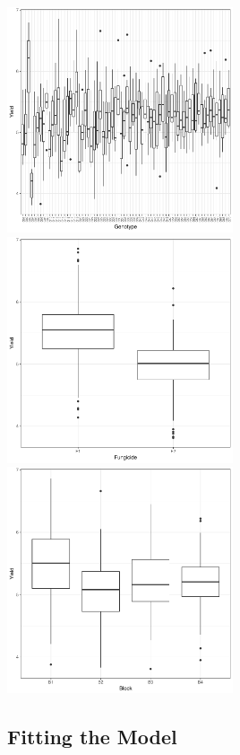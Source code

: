 \documentclass[a4paper, 10pt, fleqn, twosided]{memoir}
\begin{document}
\begin{tcolorbox}[title = Example 5 Boxplots]
\includegraphics[width=0.5\textwidth, frame]{example5_Genoboxplot.pdf}
\includegraphics[width=0.5\textwidth, frame]{example5_Fungboxplot.pdf}
\includegraphics[width=0.5\textwidth, frame]{example5_Blockboxplot.pdf}
\end{tcolorbox}


\subsection{Fitting the Model}
\end{document}
